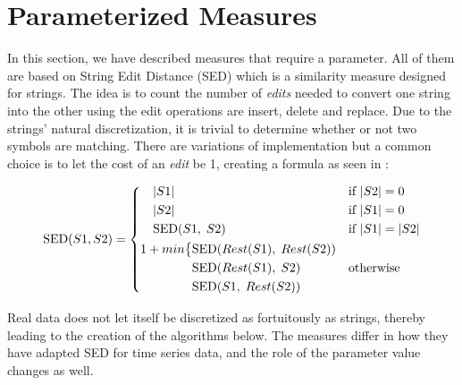 \section{Parameterized Measures}


 In this section, we have described measures that require a parameter. 
 All of them are based on String Edit Distance (SED) which is a similarity measure designed for strings.  
 The idea is to count the number of \textit{edits} needed to convert one string into the other using the edit operations are insert, delete and replace.  
 Due to the strings' natural discretization, it is trivial to determine whether or not two symbols are matching. 
There are variations of implementation but a common choice is to let the cost of an \textit{edit} be 1, creating a formula as seen in :  

\begin{equation}\label{eq:ed_string}
    \text{SED}(S1, S2) = \begin{dcases}
        \quad |S1| & \text{if }  |S2| = 0\\
     	\quad |S2| & \text{if }  |S1| = 0\\
        \quad \text{SED}(S1,\; S2) & \text{if }  |S1| =|S2| \\
        \begin{aligned}
        1 + min\big\{   & \text{SED}(Rest(S1), \; Rest(S2)) \\
              	     & \text{SED}(Rest(S1), \; S2) \\
           		    & \text{SED}(S1, \; Rest(S2)) \\
        \end{aligned} & \text{otherwise}
  \end{dcases}
\end{equation}

Real data does not let itself be discretized as fortuitously as strings, thereby leading to the creation of the algorithms below. 
The measures differ in how they have adapted SED for time series data, and the role of the parameter value changes as well. 
 


